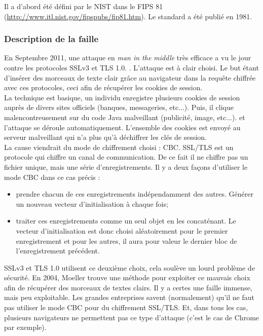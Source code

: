 Il a d'abord été défini par le NIST dans le FIPS 81 (\url{http://www.itl.nist.gov/fipspubs/fip81.htm}). Le standard a été publié en 1981.

\subsubsection{Description de la faille}

En Septembre 2011, une attaque en \textit{man in the middle} très efficace a vu le jour contre les protocoles SSLv3 et TLS 1.0. \cite{ekr2011beast} \cite{imperial2011beast} \cite{goodin2011beast} \cite{gallagher2011beast}. L'attaque est à clair choisi. Le but étant d'insérer des morceaux de texte clair grâce au navigateur dans la requête chiffrée avec ces protocoles, ceci afin de récupérer les cookies de session.\\

La technique est basique, un individu enregistre plusieurs cookies de session auprès de divers sites officiels (banques, messageries, etc...). Puis, il clique malencontreusement sur du code Java malveillant (publicité, image, etc...). et l'attaque se déroule automatiquement. L'ensemble des cookies est envoyé au serveur malveillant qui n'a plus qu'à déchiffrer les clés de session.\\

La cause viendrait du mode de chiffrement choisi : CBC. SSL/TLS est un protocole qui chiffre un canal de communication. De ce fait il ne chiffre pas un fichier unique, mais une série d'enregistrements. Il y a deux façons d'utiliser le mode CBC dans ce cas précis :
\begin{itemize}
\item prendre chacun de ces enregistrements indépendamment des autres. Générer un nouveau vecteur d'initialisation à chaque fois;
\item traiter ces enregistrements comme un seul objet en les concaténant. Le vecteur d'initialisation est donc choisi aléatoirement pour le premier enregistrement et pour les autres, il aura pour valeur le dernier bloc de l'enregistrement précédent.\\

\end{itemize}

SSLv3 et TLS 1.0 utilisent ce deuxième choix, cela soulève un lourd problème de sécurité. En 2004, Moeller \cite{moeller2004cbc} trouve une méthode pour exploiter ce mauvais choix afin de récupérer des morceaux de textes clairs. Il y a certes une faille immense, mais peu exploitable. Les grandes entreprises savent (normalement) qu'il ne faut pas utiliser le mode CBC pour du chiffrement SSL/TLS. Et, dans tous les cas, plusieurs navigateurs ne permettent pas ce type d'attaque (c'est le cas de Chrome par exemple).


